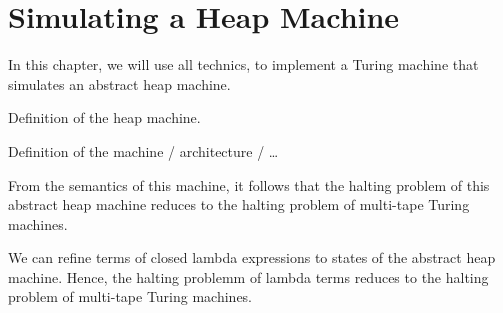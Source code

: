 \chapter{Simulating a Heap Machine}
\label{chap:heap}


In this chapter, we will use all technics, to implement a Turing machine that simulates an abstract heap machine.

Definition of the heap machine.

Definition of the machine / architecture / \dots

From the semantics of this machine, it follows that the halting problem of this abstract heap machine reduces to the halting problem of multi-tape Turing machines.

We can refine terms of closed lambda expressions to states of the abstract heap machine.
Hence, the halting problemm of lambda terms reduces to the halting problem of multi-tape Turing machines.


